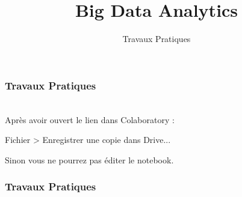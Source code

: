 \documentclass{formation}
\title{Big Data Analytics}
\subtitle{Travaux Pratiques}
\begin{document}
\maketitle

\begin{frame}
  \frametitle{Travaux Pratiques}
   \\
  \newline
  Après avoir ouvert le lien dans Colaboratory :
  \begin{center}
    Fichier > Enregistrer une copie dans Drive...
  \end{center}
  Sinon vous ne pourrez pas éditer le notebook.
\end{frame}

\begin{frame}
  \frametitle{Travaux Pratiques}
   \\
\end{frame}
\end{document}
